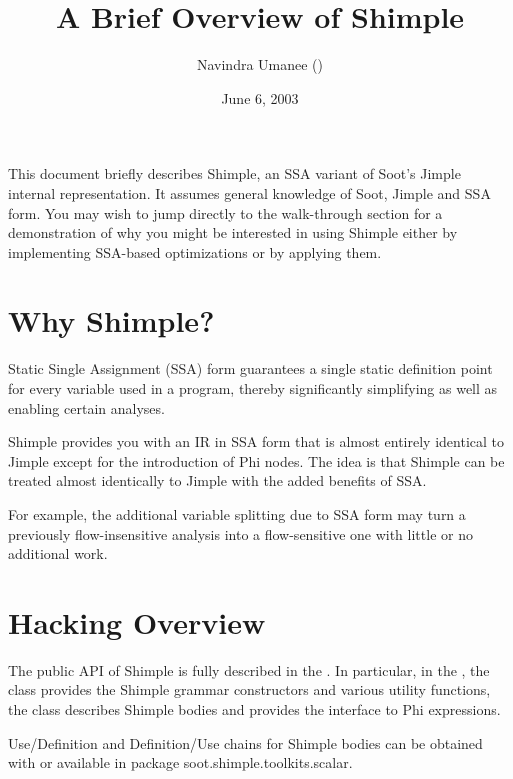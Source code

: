 \documentclass[10pt,letterpaper,oneside,onecolumn]{article}
\title{A Brief Overview of Shimple}
\author{Navindra Umanee
(\htmladdnormallink{navindra@cs.mcgill.ca}{mailto:navindra@cs.mcgill.ca})}
\date{June 6, 2003}
\begin{document}
\maketitle

This document briefly describes Shimple, an SSA variant of Soot's
Jimple internal representation.  It assumes general knowledge of Soot,
Jimple and SSA form. You may wish to jump directly to the walk-through
section for a demonstration of why you might be interested in using
Shimple either by implementing SSA-based optimizations or by applying
them.

\section{Why Shimple?}

Static Single Assignment (SSA) form guarantees a single static
definition point for every variable used in a program, thereby
significantly simplifying as well as enabling certain analyses.

Shimple provides you with an IR in SSA form that is almost entirely
identical to Jimple except for the introduction of Phi nodes.  The
idea is that Shimple can be treated almost identically to Jimple with
the added benefits of SSA.  

For example, the additional variable splitting due to SSA form may
turn a previously flow-insensitive analysis into a flow-sensitive one
with little or no additional work.

\section{Hacking Overview}

The public API of Shimple is fully described in the
.  In particular,
in the ,
the
class provides the Shimple grammar constructors and various utility
functions, the
class describes Shimple bodies and
provides the interface to Phi expressions.

Use/Definition and Definition/Use chains for Shimple bodies can be
obtained with
or
available in package soot.shimple.toolkits.scalar.
\end{document}
